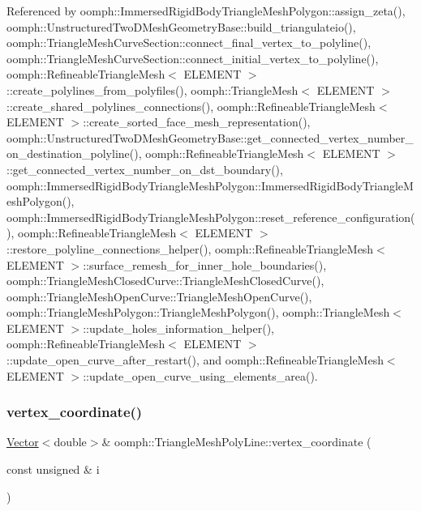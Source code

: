Referenced by oomph\+::\+Immersed\+Rigid\+Body\+Triangle\+Mesh\+Polygon\+::assign\+\_\+zeta(), oomph\+::\+Unstructured\+Two\+D\+Mesh\+Geometry\+Base\+::build\+\_\+triangulateio(), oomph\+::\+Triangle\+Mesh\+Curve\+Section\+::connect\+\_\+final\+\_\+vertex\+\_\+to\+\_\+polyline(), oomph\+::\+Triangle\+Mesh\+Curve\+Section\+::connect\+\_\+initial\+\_\+vertex\+\_\+to\+\_\+polyline(), oomph\+::\+Refineable\+Triangle\+Mesh$<$ E\+L\+E\+M\+E\+N\+T $>$\+::create\+\_\+polylines\+\_\+from\+\_\+polyfiles(), oomph\+::\+Triangle\+Mesh$<$ E\+L\+E\+M\+E\+N\+T $>$\+::create\+\_\+shared\+\_\+polylines\+\_\+connections(), oomph\+::\+Refineable\+Triangle\+Mesh$<$ E\+L\+E\+M\+E\+N\+T $>$\+::create\+\_\+sorted\+\_\+face\+\_\+mesh\+\_\+representation(), oomph\+::\+Unstructured\+Two\+D\+Mesh\+Geometry\+Base\+::get\+\_\+connected\+\_\+vertex\+\_\+number\+\_\+on\+\_\+destination\+\_\+polyline(), oomph\+::\+Refineable\+Triangle\+Mesh$<$ E\+L\+E\+M\+E\+N\+T $>$\+::get\+\_\+connected\+\_\+vertex\+\_\+number\+\_\+on\+\_\+dst\+\_\+boundary(), oomph\+::\+Immersed\+Rigid\+Body\+Triangle\+Mesh\+Polygon\+::\+Immersed\+Rigid\+Body\+Triangle\+Mesh\+Polygon(), oomph\+::\+Immersed\+Rigid\+Body\+Triangle\+Mesh\+Polygon\+::reset\+\_\+reference\+\_\+configuration(), oomph\+::\+Refineable\+Triangle\+Mesh$<$ E\+L\+E\+M\+E\+N\+T $>$\+::restore\+\_\+polyline\+\_\+connections\+\_\+helper(), oomph\+::\+Refineable\+Triangle\+Mesh$<$ E\+L\+E\+M\+E\+N\+T $>$\+::surface\+\_\+remesh\+\_\+for\+\_\+inner\+\_\+hole\+\_\+boundaries(), oomph\+::\+Triangle\+Mesh\+Closed\+Curve\+::\+Triangle\+Mesh\+Closed\+Curve(), oomph\+::\+Triangle\+Mesh\+Open\+Curve\+::\+Triangle\+Mesh\+Open\+Curve(), oomph\+::\+Triangle\+Mesh\+Polygon\+::\+Triangle\+Mesh\+Polygon(), oomph\+::\+Triangle\+Mesh$<$ E\+L\+E\+M\+E\+N\+T $>$\+::update\+\_\+holes\+\_\+information\+\_\+helper(), oomph\+::\+Refineable\+Triangle\+Mesh$<$ E\+L\+E\+M\+E\+N\+T $>$\+::update\+\_\+open\+\_\+curve\+\_\+after\+\_\+restart(), and oomph\+::\+Refineable\+Triangle\+Mesh$<$ E\+L\+E\+M\+E\+N\+T $>$\+::update\+\_\+open\+\_\+curve\+\_\+using\+\_\+elements\+\_\+area().

\mbox{\label{classoomph_1_1TriangleMeshPolyLine_a8b90405e6926cdaf10506552280e828c}} 
\subsubsection{\texorpdfstring{vertex\+\_\+coordinate()}{vertex\_coordinate()}\hspace{0.1cm}{\footnotesize\ttfamily [2/2]}}
{\footnotesize\ttfamily \hyperlink{classoomph_1_1Vector}{Vector}$<$double$>$\& oomph\+::\+Triangle\+Mesh\+Poly\+Line\+::vertex\+\_\+coordinate (\begin{DoxyParamCaption}\item[{const unsigned \&}]{i }\end{DoxyParamCaption})\hspace{0.3cm}{\ttfamily [inline]}}



